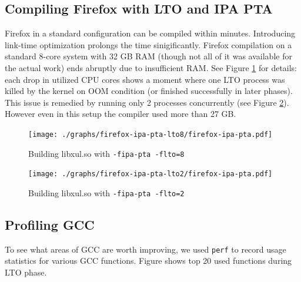 \subsection{Compiling Firefox with LTO and IPA PTA}

Firefox in a standard configuration can be compiled within minutes. Introducing
link-time optimization prolongs the time sinigificantly. Firefox compilation on
a standard 8-core system with 32 GB RAM (though not all of it was available for the
actual work) ends abruptly due to insufficient RAM. See Figure
\ref{figure-firefox-ipa-pta-lto8} for details: each drop in utilized CPU cores
shows a moment where one LTO process was killed by the kernel on OOM condition
(or finished successfully in later phases). This issue is remedied by running
only 2 processes concurrently (see Figure \ref{figure-firefox-ipa-pta-lto2}).
However even in this setup the compiler used more than 27 GB.

\begin{figure}[h!]
	\label{figure-firefox-ipa-pta-lto8}
	\centering
	\texttt{[image: ./graphs/firefox-ipa-pta-lto8/firefox-ipa-pta.pdf]}
	\caption{Building libxul.so with {\tt -fipa-pta -flto=8}}
\end{figure}

\begin{figure}[h!]
	\label{figure-firefox-ipa-pta-lto2}
	\centering
	\texttt{[image: ./graphs/firefox-ipa-pta-lto2/firefox-ipa-pta.pdf]}
	\caption{Building libxul.so with {\tt -fipa-pta -flto=2}}
\end{figure}

\subsection{Profiling GCC}

To see what areas of GCC are worth improving, we used {\tt perf} to record usage
statistics for various GCC functions. Figure  shows top 20 used
functions during LTO phase.







